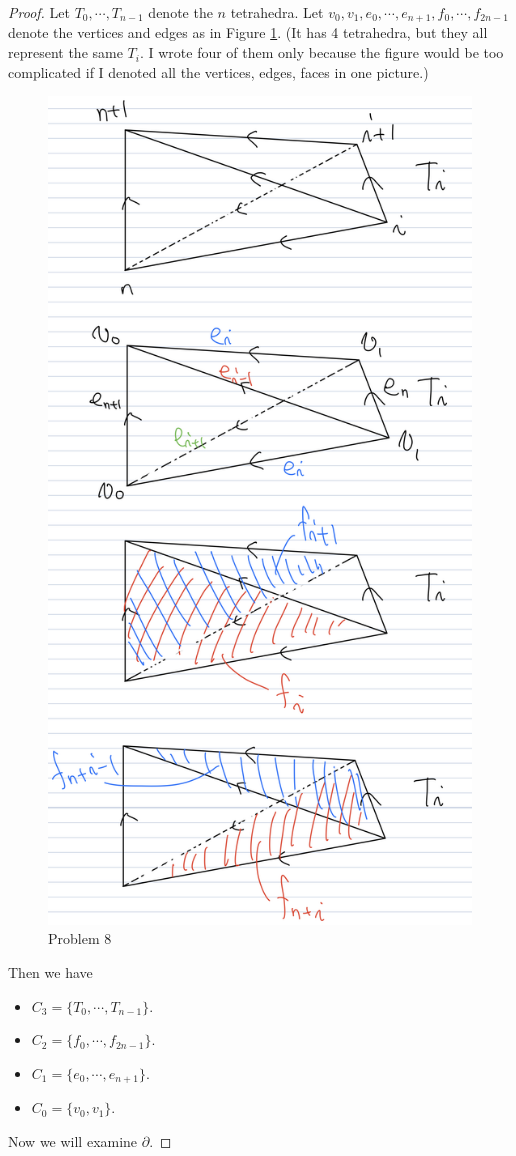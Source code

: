 \documentclass[12pt, psamsfonts]{amsart}
\theoremstyle{definition}
\theoremstyle{remark}
\numberwithin{equation}{section}
\begin{document}
\begin{proof}
  Let $T_0, \cdots, T_{n - 1}$ denote the $n$ tetrahedra.
  Let $v_0, v_1, e_0, \cdots, e_{n + 1}, f_{0}, \cdots, f_{2n - 1}$ denote the vertices and edges as in Figure \ref{fig:lens}.
  (It has 4 tetrahedra, but they all represent the same $T_i$.
  I wrote four of them only because the figure would be too complicated if I denoted all the vertices, edges, faces in one picture.)

  \begin{figure}
    \includegraphics[width=.5\linewidth]{lens.jpeg}
    \caption{Problem 8}
    \label{fig:lens}
  \end{figure}

  Then we have
  \begin{itemize}
    \item
      $C_3 = \{ T_0, \cdots, T_{n - 1} \}$.
    \item
      $C_2 = \{ f_0, \cdots, f_{2n - 1} \}$.
    \item
      $C_1 = \{ e_0, \cdots, e_{n + 1} \}$.
    \item
      $C_0 = \{ v_0, v_1 \}$.
  \end{itemize}

  Now we will examine $\partial$.


\end{proof}
\end{document}
